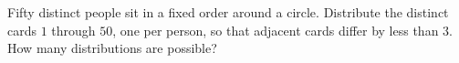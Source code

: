 Fifty distinct people sit in a fixed order around a circle. Distribute the distinct cards $1$ through $50$, one per person, so that adjacent cards differ by less than $3$. How many distributions are possible?
